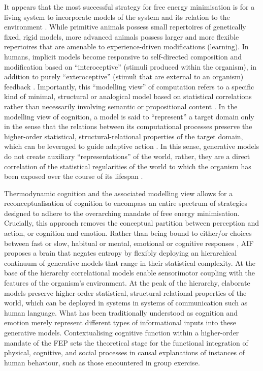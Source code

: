 \begin{CJK}{UTF8}{gbsn}
It appears that the most successful strategy for free energy minimisation is for a living system to incorporate models of the system and its relation to the environment \citep{Conant1970}.  While primitive animals possess small repertoires of genetically fixed, rigid models, more advanced animals possess larger and more flexible repertoires that are amenable to experience-driven modifications (learning).  In humans, implicit models become responsive to self-directed composition and modification based on ``interoceptive'' (stimuli produced within the organism), in addition to purely ``exteroceptive'' (stimuli that are external to an organism) feedback \citep{Yufik1998,FeldmanBarrett2015}.  Importantly, this ``modelling view'' of computation \citep{Grush 2001;Chirimuuta2014} refers to a specific kind of minimal, structural or analogical model based on statistical correlations rather than necessarily involving semantic or propositional content \citep[also known as ``generative models''][]{Friston2001,OBrien2004,Huto2015}.  In the modelling view of cognition, a model is said to ``represent'' a target domain only in the sense that the relations between its computational processes preserve the higher-order statistical, structural-relational properties of the target domain, which can be leveraged to guide adaptive action \citep[see][8]{Ramstead2016}.  In this sense, generative models do not create auxiliary ``representations'' of the world, rather, they are a direct correlation of the statistical regularities of the world to which the organism has been exposed over the course of its lifespan \citep{Ramstead2017}.

Thermodynamic cognition and the associated modelling view allows for a reconceptualisation of cognition to encompass an entire spectrum of strategies designed to adhere to the overarching mandate of free energy minimisation. Crucially, this approach removes the conceptual partition between
perception and action, or cognition and emotion.  Rather than being bound to either/or choices between fast or slow, habitual or mental, emotional or cognitive responses \citep[see][]{Kahneman2011}, AIF proposes a brain that negates entropy by flexibly deploying an hierarchical continuum of generative models that range in their statistical complexity. At the base of the hierarchy correlational models enable sensorimotor coupling with the features of the organism's environment.  At the peak of the hierarchy, elaborate models preserve higher-order statistical, structural-relational properties of the world, which can be deployed in systems in systems of communication such as human language.  What has been traditionally understood as cognition and emotion merely represent different types of informational inputs into these generative models.  Contextualising cognitive function within a higher-order mandate of the FEP sets the theoretical stage for the functional integration of physical, cognitive, and social processes in causal explanations of instances of human behaviour, such as those encountered in group exercise.


\end{CJK}
